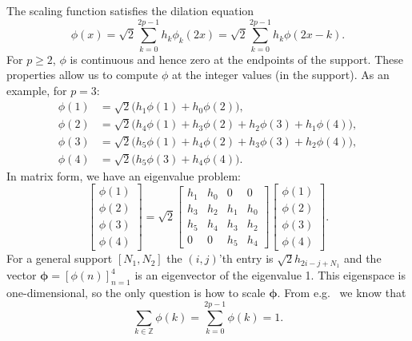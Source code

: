 \documentclass[a4paper]{scrartcl}
\newcommand{\vv}[1]{\ensuremath{\bm{#1}}}
\begin{document}
The scaling function satisfies the dilation equation
\begin{equation}
	\label{eq:internal_scaling_function_definition}
	\phi(x) 
	= \sqrt2 \sum_{k=0}^{2p-1} h_k \phi_k(2x)
	= \sqrt2 \sum_{k=0}^{2p-1} h_k \phi(2x - k).
\end{equation}
For $p\geq2$, $\phi$ is continuous and hence zero at the endpoints of the support.
These properties allow us to compute $\phi$ at the integer values (in the support).
As an example, for $p = 3$:
\begin{align*}
	\phi(1) 
    & = \sqrt2 \bigl(h_1\phi(1) + h_0\phi(2)\bigr),
	\\
	\phi(2)
    & = \sqrt2 \bigl(h_4\phi(1) + h_3\phi(2) + h_2\phi(3) + h_1\phi(4)\bigr),
	\\
	\phi(3)
    & = \sqrt2 \bigl(h_5\phi(1) + h_4\phi(2) + h_3\phi(3) + h_2\phi(4)\bigr),
	\\
	\phi(4)
    & = \sqrt2 \bigl(h_5\phi(3) + h_4\phi(4)\bigr).
\end{align*}
In matrix form, we have an eigenvalue problem:
\begin{equation*}
	\begin{bmatrix}
		\phi(1) \\ \phi(2) \\ \phi(3) \\ \phi(4)
	\end{bmatrix}
	=
	\sqrt2
	\begin{bmatrix}
		h_1 & h_0 & 0 & 0
		\\
		h_3 & h_2 & h_1 & h_0
		\\
		h_5 & h_4 & h_3 & h_2
		\\
		0 & 0 & h_5 & h_4
	\end{bmatrix}
	\begin{bmatrix}
		\phi(1) \\ \phi(2) \\ \phi(3) \\ \phi(4)
	\end{bmatrix}.
\end{equation*}
For a general support $[N_1, N_2]$ the $(i,j)$'th entry is $\sqrt2 h_{2i-j+N_1}$ and the vector $\vv\phi = [\phi(n)]_{n=1}^4$ is an eigenvector of the eigenvalue 1.
This eigenspace is one-dimensional, so the only question is how to scale $\vv\phi$.
From e.g.\ \cite[page 69]{Cohen:Daubechies:Vial:1993} we know that
\begin{equation*}
	\sum_{k\in\mathbb{Z}} \phi(k)
	= \sum_{k=0}^{2p-1} \phi(k)
	= 1.
\end{equation*}
\end{document}
